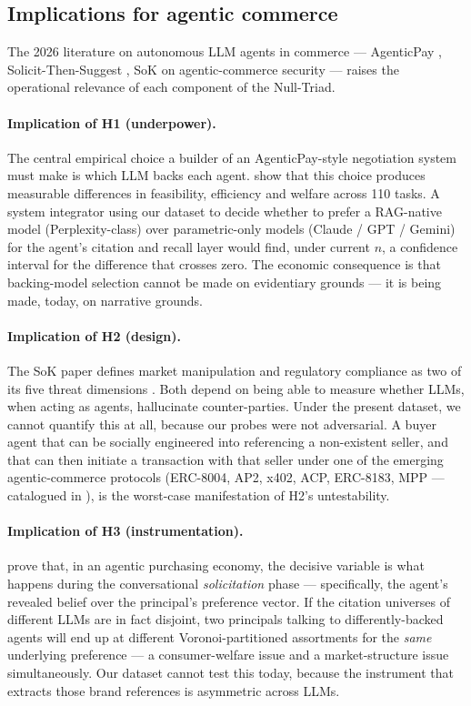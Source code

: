 \documentclass[preprint,12pt,authoryear]{elsarticle}
\begin{document}
\subsection{Implications for agentic commerce}\label{sec:agentic}

The 2026 literature on autonomous LLM agents in commerce --- AgenticPay \citep{Liu2026AgenticPay}, Solicit-Then-Suggest \citep{Cao2026Solicit}, SoK on agentic-commerce security \citep{Mao2026SoK} --- raises the operational relevance of each component of the Null-Triad.

\paragraph{Implication of H1 (underpower).} The central empirical choice a builder of an AgenticPay-style negotiation system must make is which LLM backs each agent. \citet{Liu2026AgenticPay} show that this choice produces measurable differences in feasibility, efficiency and welfare across 110 tasks. A system integrator using our dataset to decide whether to prefer a RAG-native model (Perplexity-class) over parametric-only models (Claude / GPT / Gemini) for the agent's citation and recall layer would find, under current $n$, a confidence interval for the difference that crosses zero. The economic consequence is that backing-model selection cannot be made on evidentiary grounds --- it is being made, today, on narrative grounds.

\paragraph{Implication of H2 (design).} The SoK paper defines market manipulation and regulatory compliance as two of its five threat dimensions \citep{Mao2026SoK}. Both depend on being able to measure whether LLMs, when acting as agents, hallucinate counter-parties. Under the present dataset, we cannot quantify this at all, because our probes were not adversarial. A buyer agent that can be socially engineered into referencing a non-existent seller, and that can then initiate a transaction with that seller under one of the emerging agentic-commerce protocols (ERC-8004, AP2, x402, ACP, ERC-8183, MPP --- catalogued in \citealt{Mao2026SoK}), is the worst-case manifestation of H2's untestability.

\paragraph{Implication of H3 (instrumentation).} \citet{Cao2026Solicit} prove that, in an agentic purchasing economy, the decisive variable is what happens during the conversational \emph{solicitation} phase --- specifically, the agent's revealed belief over the principal's preference vector. If the citation universes of different LLMs are in fact disjoint, two principals talking to differently-backed agents will end up at different Voronoi-partitioned assortments for the \emph{same} underlying preference --- a consumer-welfare issue and a market-structure issue simultaneously. Our dataset cannot test this today, because the instrument that extracts those brand references is asymmetric across LLMs.
\end{document}

